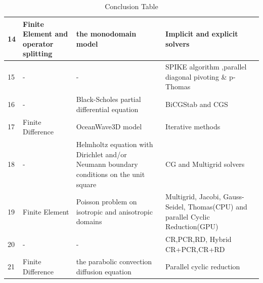 \begin{table}[t]
\begin{center}
\begin{tabular}{| l | p{4cm} | p{6cm} | p{6cm} |}
       14	& Finite Element and operator splitting	& the monodomain model	& Implicit and explicit solvers \\ \hline
        15	& - &	-	& SPIKE algorithm ,parallel diagonal pivoting \& p-Thomas\\ \hline
        16	& - &	Black-Scholes partial differential equation &	BiCGStab and CGS\\ \hline
        17	& Finite Difference	& OceanWave3D model 	& Iterative methods\\ \hline
        18	& - &	Helmholtz equation with Dirichlet and/or Neumann boundary conditions on the unit square &	CG and Multigrid  solvers\\ \hline
       19	& Finite Element	& Poisson problem on isotropic and anisotropic domains	& Multigrid, Jacobi, Gauss-Seidel, Thomas(CPU) and parallel Cyclic Reduction(GPU) \\ \hline
       20 &	- &	-	& CR,PCR,RD, Hybrid CR+PCR,CR+RD \\ \hline
       21	&  Finite Difference	& the parabolic convection diffusion equation &	Parallel cyclic reduction\\ \hline
        
        \hline
        \end{tabular}
    \end{center}

    \caption{Conclusion Table}
    \label{table:concl}
\end{table}



